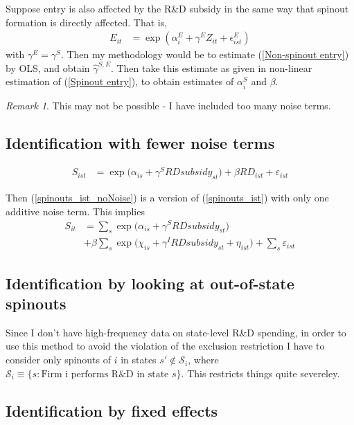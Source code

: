 \documentclass[12pt,english]{article}
\theoremstyle{remark}
\newtheorem{remark}{Remark}
\begin{document}
Suppose entry is also affected by the R\&D subsidy in the same way that spinout formation is directly affected. That is,
\begin{align}
	E_{it} &= \exp(\alpha_i^E + \gamma^E Z_{it} + \epsilon^E_{ist}) \label{Non-spinout entry}
\end{align}
with $\gamma^E = \gamma^S$. Then my methodology would be to estimate (\ref{Non-spinout entry}) by OLS, and obtain $\hat{\gamma}^{S,E}$. Then take this estimate as given in non-linear estimation of (\ref{Spinout entry}), to obtain estimates of $\alpha_i^S$ and $\beta$.

\begin{remark}
	This may not be possible - I have included too many noise terms. 
\end{remark}

\subsection{Identification with fewer noise terms}

\begin{align}
S_{ist} &= \exp\Big(\alpha_{is} + \gamma^S RDsubsidy_{st}\Big) + \beta RD_{ist} + \varepsilon_{ist} \label{spinouts_ist_noNoise}
\end{align}

Then (\ref{spinouts_ist_noNoise}) is a version of (\ref{spinouts_ist}) with only one additive noise term. This implies
\begin{align}
	S_{it} &= \sum_s \exp\Big(\alpha_{is} + \gamma^S RDsubsidy_{st} \Big) \nonumber \\
			&+ \beta \sum_s \exp \Big( \chi_{is} + \gamma^I RDsubsidy_{st} + \eta_{ist} \Big) + \sum_s \varepsilon_{ist} 
\end{align}


\subsection{Identification by looking at out-of-state spinouts}

Since I don't have high-frequency data on state-level R\&D spending, in order to use this method to avoid the violation of the exclusion restriction I have to consider only spinouts of $i$ in states $s' \notin \mathcal{S}_i$, where $\mathcal{S}_i \equiv \Big\{ s : \textrm{Firm i performs R\&D in state $s$} \Big\}$. This restricts things quite severeley.

\subsection{Identification by fixed effects}
\end{document}
